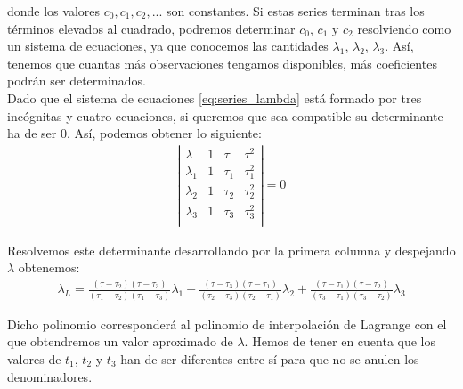 \documentclass[11pt]{article}
\begin{document}
\noindent donde los valores $c_0, c_1, c_2, ...$ son constantes. Si estas series terminan tras los términos elevados al cuadrado, podremos determinar $c_0$, $c_1$ y $c_2$ resolviendo como un sistema de ecuaciones, ya que conocemos las cantidades $\lambda_1$, $\lambda_2$, $\lambda_3$. Así, tenemos que cuantas más observaciones tengamos disponibles, más coeficientes podrán ser determinados.\\

Dado que el sistema de ecuaciones \eqref{eq:series_lambda} está formado por tres incógnitas y cuatro ecuaciones, si queremos que sea compatible su determinante ha de ser 0. Así, podemos obtener lo siguiente:
\begin{align}
\left|
\begin{array}{cccc}
\lambda & 1 & \tau & \tau^2\\
\lambda_1 & 1 & \tau_1 & \tau^2_1\\
\lambda_2 & 1 & \tau_2 & \tau^2_2\\
\lambda_3 & 1 & \tau_3 & \tau^2_3\\
\end{array}
\right|
=0
\label{eq:resultante}
\end{align}

Resolvemos este determinante desarrollando por la primera columna y despejando $\lambda$ obtenemos:
\begin{align}
\lambda_L=
\frac{(\tau-\tau_2)(\tau-\tau_3)}{(\tau_1-\tau_2)(\tau_1-\tau_3)}\lambda_1
+\frac{(\tau-\tau_3)(\tau-\tau_1)}{(\tau_2-\tau_3)(\tau_2-\tau_1)}\lambda_2
+\frac{(\tau-\tau_1)(\tau-\tau_2)}{(\tau_3-\tau_1)(\tau_3-\tau_2)}\lambda_3
\label{eq:lambda_value}
\end{align}

Dicho polinomio corresponderá al polinomio de interpolación de Lagrange con el que obtendremos un valor aproximado de $\lambda$. Hemos de tener en cuenta que los valores de $t_1$, $t_2$ y $t_3$ han de ser diferentes entre sí para que no se anulen los denominadores.\\
\end{document}

